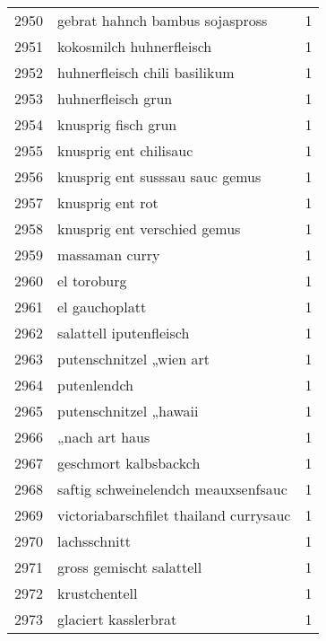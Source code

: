 \begin{tabular}{llr}
2950 &                    gebrat hahnch bambus sojaspross &      1 \\
2951 &                           kokosmilch huhnerfleisch &      1 \\
2952 &                      huhnerfleisch chili basilikum &      1 \\
2953 &                                 huhnerfleisch grun &      1 \\
2954 &                                knusprig fisch grun &      1 \\
2955 &                             knusprig ent chilisauc &      1 \\
2956 &                    knusprig ent susssau sauc gemus &      1 \\
2957 &                                   knusprig ent rot &      1 \\
2958 &                       knusprig ent verschied gemus &      1 \\
2959 &                                     massaman curry &      1 \\
2960 &                                        el toroburg &      1 \\
2961 &                                     el gauchoplatt &      1 \\
2962 &                            salattell iputenfleisch &      1 \\
2963 &                           putenschnitzel „wien art &      1 \\
2964 &                                        putenlendch &      1 \\
2965 &                             putenschnitzel „hawaii &      1 \\
2966 &                                     „nach art haus &      1 \\
2967 &                              geschmort kalbsbackch &      1 \\
2968 &                saftig schweinelendch meauxsenfsauc &      1 \\
2969 &             victoriabarschfilet thailand currysauc &      1 \\
2970 &                                       lachsschnitt &      1 \\
2971 &                           gross gemischt salattell &      1 \\
2972 &                                      krustchentell &      1 \\
2973 &                               glaciert kasslerbrat &      1 \\

\end{tabular}
